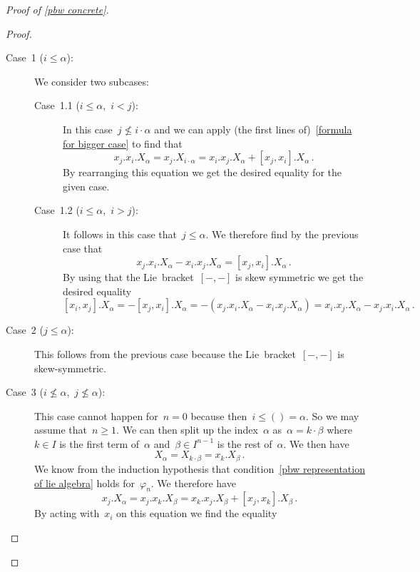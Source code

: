 \begin{proof}[Proof of \cref{pbw concrete}]
\begin{proof}
    \begin{description}
      \item[Case~1 \textup($i \leq \alpha$\textup):]
        We consider two subcases:
        \begin{description}
          \item[Case~1.1 \textup($i \leq \alpha$,~$i < j$\textup):]
            In this case~$j \nleq i \cdot \alpha$ and we can apply (the first lines of)~\eqref{formula for bigger case} to find that
            \[
              x_j.x_i.X_\alpha
              =
              x_j.X_{i \cdot \alpha}
              =
              x_i.x_j.X_\alpha + [x_j,x_i].X_\alpha \,.
            \]
            By rearranging this equation we get the desired equality for the given case.
          \item[Case~1.2 \textup($i \leq \alpha$,~$i > j$\textup):]
            It follows in this case that~$j \leq \alpha$.
            We therefore find by the previous case that
            \[
              x_j.x_i.X_\alpha - x_i.x_j.X_\alpha
              =
              [x_j, x_i].X_\alpha \,.
            \]
            By using that the Lie~bracket~$[-,-]$ is skew symmetric we get the desired equality
            \[
              [x_i, x_j].X_\alpha
              =
              -[x_j, x_i].X_\alpha
              =
              -(x_j.x_i.X_\alpha - x_i.x_j.X_\alpha)
              =
              x_i.x_j.X_\alpha - x_j.x_i.X_\alpha \,.
            \]
        \end{description}
      \item[Case~2 \textup($j \leq \alpha$\textup):]
        This follows from the previous case because the Lie~bracket~$[-,-]$ is skew-symmetric.
      \item[Case~3 \textup($i \nleq \alpha$,~$j \nleq \alpha$\textup):]
        This case cannot happen for~$n = 0$ because then~$i \leq () = \alpha$.
        So we may assume that~$n \geq 1$.
        We can then split up the index~$\alpha$ as~$\alpha = k \cdot \beta$ where~$k \in I$ is the first term of~$\alpha$ and~$\beta \in I^{n-1}$ is the rest of~$\alpha$.
        We then have
        \[
          X_\alpha
          =
          X_{k \cdot \beta}
          =
          x_k.X_\beta \,.
        \]
        We know from the induction hypothesis that condition~\ref*{pbw representation of lie algebra} holds for~$\varphi_n$.
        We therefore have
        \[
          x_j.X_\alpha
          =
          x_j.x_k.X_\beta
          =
          x_k.x_j.X_\beta + [x_j, x_k].X_\beta  \,.
        \]
        By acting with~$x_i$ on this equation we find the equality

\end{description}
\end{proof}
\end{proof}
